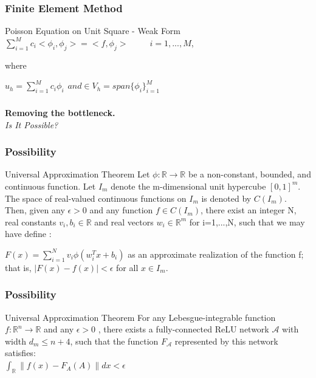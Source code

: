 \documentclass{beamer}
\newcommand{\R}{\mathbb{R}}
\begin{document}
\begin{frame}
	\frametitle{Finite Element Method}	
	\begin{block}{Poisson Equation on Unit Square - Weak Form}		
		$\sum_{i=1}^{M} c_i <\phi_i,\phi_j> = <f,\phi_j> \hspace{30pt} i=1,...,M$,	
				
		where	
		
		 $u_h = \sum_{i=1}^{M} c_i \phi_i \hspace{5pt} and \in V_h=span\{\phi_i\}_{i=1}^{M}$		
	\end{block}	
\end{frame}

\begin{frame}
	\frametitle{}
	
	\textbf{Removing the bottleneck.}\centering\\
	\textit{Is It Possible?}\centering\\
	
\end{frame}


\begin{frame}
	\frametitle{Possibility}
	
	\begin{block}{Universal Approximation Theorem}
		Let $\phi:\R \to \R$ be a non-constant, bounded, and continuous function. Let $I_m$ denote the m-dimensional unit hypercube $[0, 1]^m$. The space of real-valued continuous functions on $I_m$ is denoted by $C(I_m)$. Then, given any $\epsilon >0$ and any function $f \in C(I_m)$, there exist an integer N, real constants $v_i, b_i \in \R$ and real vectors $w_i \in \R^m$ for i=1,...,N, such that we may have define :
		
		$F(x) = \sum_{i=1}^{N} v_i \phi(w_{i}^{T}x + b_i)$
		as an approximate realization of the function f; that is,
		$|F(x)-f(x)| < \epsilon$
		for all $x\in I_m$. 
	\end{block}	
\end{frame}

\begin{frame}
	\frametitle{Possibility}
	
	\begin{block}{Universal Approximation Theorem}	
		For any Lebesgue-integrable function $f:\R^{n}\rightarrow \R$ and any $\epsilon > 0$ , there exists a fully-connected ReLU network $\mathcal{A}$ with width $d_{m}\leq {n+4}$, such that the function $F_{\mathcal{A}}$ represented by this network satisfies:\\
		 $\int_{\R}^{} \|f(x) - F_{A}(A)\| dx < \epsilon $
	\end{block}	
\end{frame}
\end{document}
